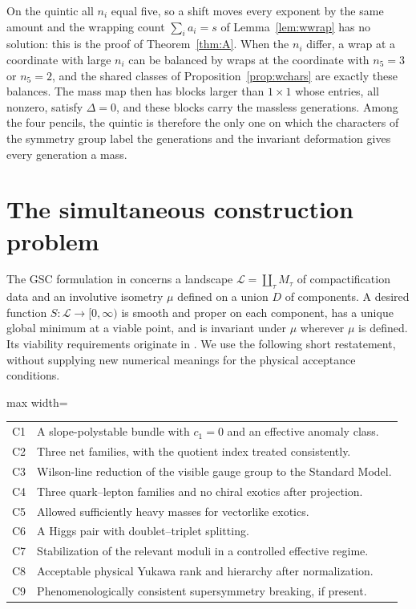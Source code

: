 \begin{remark}\label{rem:wquintic}
On the quintic all $n_i$ equal five, so a shift moves every exponent by the
same amount and the wrapping count $\sum_ia_i=s$ of
Lemma~\ref{lem:wwrap} has no solution: this is the proof of
Theorem~\ref{thm:A}. When the $n_i$ differ, a wrap at a coordinate with
large $n_i$ can be balanced by wraps at the coordinate with $n_5=3$ or
$n_5=2$, and the shared classes of Proposition~\ref{prop:wchars} are
exactly these balances. The mass map then has blocks larger than $1\times1$
whose entries, all nonzero, satisfy $\Delta=0$, and these blocks carry the
massless generations. Among the four pencils, the quintic is therefore the
only one on which the characters of the symmetry group label the
generations and the invariant deformation gives every generation a mass.
\end{remark}



\section{The simultaneous construction problem}\label{sec:selection}
The GSC formulation in \cite{Dwork,Mirror} concerns a landscape
$\mathcal L=\coprod_\tau M_\tau$ of compactification data and an involutive
isometry $\mu$ defined on a union $D$ of components. A desired function
$S:\mathcal L\to[0,\infty)$ is smooth and proper on each component,
has a unique global minimum at a viable point, and is invariant under
$\mu$ wherever $\mu$ is defined. Its viability requirements originate in
\cite{Original}. We use the following short restatement, without supplying
new numerical meanings for the physical acceptance conditions.

\begin{center}\small
\begin{adjustbox}{max width=\linewidth}\begin{tabular}{@{}p{.07\linewidth}p{.85\linewidth}@{}}
\toprule
C1 & A slope-polystable bundle with $c_1=0$ and an effective anomaly class.\\
C2 & Three net families, with the quotient index treated consistently.\\
C3 & Wilson-line reduction of the visible gauge group to the Standard Model.\\
C4 & Three quark--lepton families and no chiral exotics after projection.\\
C5 & Allowed sufficiently heavy masses for vectorlike exotics.\\
C6 & A Higgs pair with doublet--triplet splitting.\\
C7 & Stabilization of the relevant moduli in a controlled effective regime.\\
C8 & Acceptable physical Yukawa rank and hierarchy after normalization.\\
C9 & Phenomenologically consistent supersymmetry breaking, if present.\\
\bottomrule
\end{tabular}\end{adjustbox}
\end{center}

